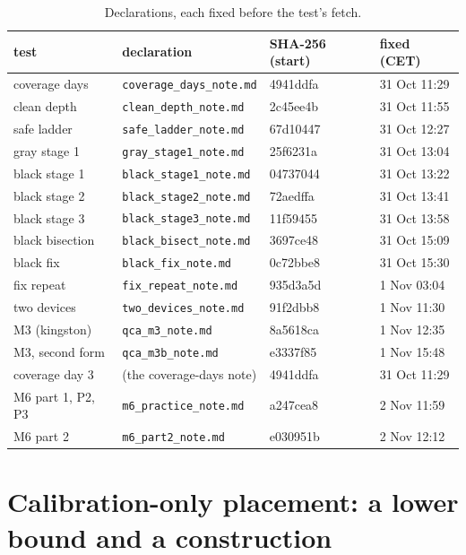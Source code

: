 \documentclass[11pt]{article}
\begin{document}
\begin{table}[h]
\centering\small
\begin{tabular}{llll}
\toprule
test & declaration & SHA-256 (start) & fixed (CET) \\
\midrule
coverage days & \texttt{coverage\_days\_note.md} & 4941ddfa & 31 Oct 11:29 \\
clean depth & \texttt{clean\_depth\_note.md} & 2c45ee4b & 31 Oct 11:55 \\
safe ladder & \texttt{safe\_ladder\_note.md} & 67d10447 & 31 Oct 12:27 \\
gray stage 1 & \texttt{gray\_stage1\_note.md} & 25f6231a & 31 Oct 13:04 \\
black stage 1 & \texttt{black\_stage1\_note.md} & 04737044 & 31 Oct 13:22 \\
black stage 2 & \texttt{black\_stage2\_note.md} & 72aedffa & 31 Oct 13:41 \\
black stage 3 & \texttt{black\_stage3\_note.md} & 11f59455 & 31 Oct 13:58 \\
black bisection & \texttt{black\_bisect\_note.md} & 3697ce48 & 31 Oct 15:09 \\
black fix & \texttt{black\_fix\_note.md} & 0c72bbe8 & 31 Oct 15:30 \\
fix repeat & \texttt{fix\_repeat\_note.md} & 935d3a5d & 1 Nov 03:04 \\
two devices & \texttt{two\_devices\_note.md} & 91f2dbb8 & 1 Nov 11:30 \\
M3 (kingston) & \texttt{qca\_m3\_note.md} & 8a5618ca & 1 Nov 12:35 \\
M3, second form & \texttt{qca\_m3b\_note.md} & e3337f85 & 1 Nov 15:48 \\
coverage day 3 & (the coverage-days note) & 4941ddfa & 31 Oct 11:29 \\
M6 part 1, P2, P3 & \texttt{m6\_practice\_note.md} & a247cea8 & 2 Nov 11:59 \\
M6 part 2 & \texttt{m6\_part2\_note.md} & e030951b & 2 Nov 12:12 \\
\bottomrule
\end{tabular}
\caption{Declarations, each fixed before the test's fetch.}
\label{tab:decl}
\end{table}

\appendix
\section{Calibration-only placement: a lower bound and a construction}\label{app:separation}
\end{document}
